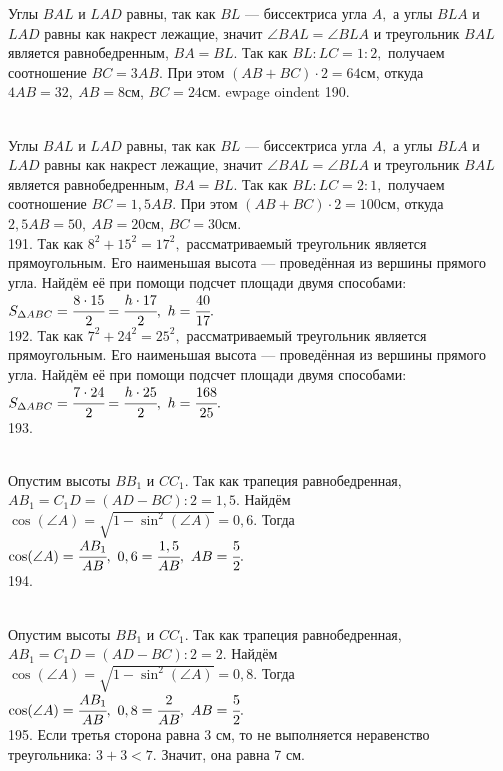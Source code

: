 Углы $BAL$ и $LAD$ равны, так как $BL$ --- биссектриса угла $A,$ а углы $BLA$ и $LAD$ равны как накрест лежащие, значит $\angle BAL=\angle BLA$ и треугольник $BAL$ является равнобедренным, $BA=BL.$ Так как $BL:LC=1:2,$ получаем соотношение $BC=3AB.$ При этом $(AB+BC)\cdot2=64$см, откуда $4AB=32,\ AB=8$см, $BC=24$см.
ewpage
oindent
190. \begin{figure}[ht!]
\end{figure}\\
Углы $BAL$ и $LAD$ равны, так как $BL$ --- биссектриса угла $A,$ а углы $BLA$ и $LAD$ равны как накрест лежащие, значит $\angle BAL=\angle BLA$ и треугольник $BAL$ является равнобедренным, $BA=BL.$ Так как $BL:LC=2:1,$ получаем соотношение $BC=1,5AB.$ При этом $(AB+BC)\cdot2=100$см, откуда $2,5AB=50,\ AB=20$см, $BC=30$см.\\
191. Так как $8^2+15^2=17^2,$ рассматриваемый треугольник является прямоугольным. Его наименьшая высота --- проведённая из вершины прямого угла. Найдём её при помощи подсчет площади двумя способами: $S_{\Delta ABC}=\cfrac{8\cdot15}{2}=\cfrac{h\cdot17}{2},\ h=\cfrac{40}{17}.$\\
192. Так как $7^2+24^2=25^2,$ рассматриваемый треугольник является прямоугольным. Его наименьшая высота --- проведённая из вершины прямого угла. Найдём её при помощи подсчет площади двумя способами: $S_{\Delta ABC}=\cfrac{7\cdot24}{2}=\cfrac{h\cdot25}{2},\ h=\cfrac{168}{25}.$\\
193. \begin{figure}[ht!]
\end{figure}\\
Опустим высоты $BB_1$ и $CC_1.$ Так как трапеция равнобедренная, $AB_1=C_1D=(AD-BC):2=1,5.$ Найдём $\cos(\angle A)=\sqrt{1-\sin^2(\angle A)}=0,6.$ Тогда
$\cos(\angle A)=\cfrac{AB_1}{AB},\ 0,6=\cfrac{1,5}{AB},\ AB=\cfrac{5}{2}.$\\
194. \begin{figure}[ht!]
\end{figure}\\
Опустим высоты $BB_1$ и $CC_1.$ Так как трапеция равнобедренная, $AB_1=C_1D=(AD-BC):2=2.$ Найдём $\cos(\angle A)=\sqrt{1-\sin^2(\angle A)}=0,8.$ Тогда
$\cos(\angle A)=\cfrac{AB_1}{AB},\ 0,8=\cfrac{2}{AB},\ AB=\cfrac{5}{2}.$\\
195. Если третья сторона равна 3 см, то не выполняется неравенство треугольника: $3+3<7.$ Значит, она равна 7 см.\\
